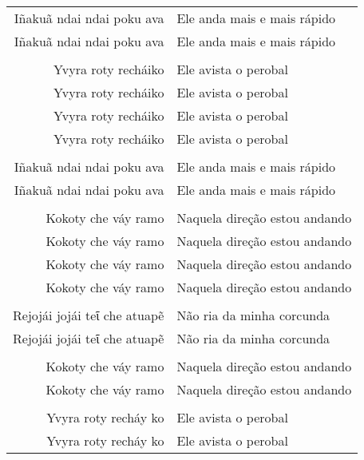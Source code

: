 \begin{table}[]
\begin{tabular}{rl}
Iñakuã ndai ndai poku ava\footnotemark{}  & Ele anda mais e mais rápido           \\
Iñakuã ndai ndai poku ava          & Ele anda mais e mais rápido           \\
                  &                     \\
Yvyra roty recháiko& Ele avista o perobal\footnotemark{}           \\
Yvyra roty recháiko& Ele avista o perobal           \\
Yvyra roty recháiko& Ele avista o perobal           \\
Yvyra roty recháiko& Ele avista o perobal           \\
                  &                     \\
Iñakuã ndai ndai poku ava   & Ele anda mais e mais rápido           \\
Iñakuã ndai ndai poku ava   & Ele anda mais e mais rápido           \\
                  &                     \\
Kokoty che váy ramo          & Naquela direção estou andando           \\
Kokoty che váy ramo          & Naquela direção estou andando           \\
Kokoty che váy ramo          & Naquela direção estou andando           \\
Kokoty che váy ramo          & Naquela direção estou andando           \\
                  &                     \\
Rejojái jojái teῖ che atuapẽ          & Não ria da minha corcunda           \\
Rejojái jojái teῖ che atuapẽ          & Não ria da minha corcunda           \\
                  &                     \\
Kokoty che váy ramo          & Naquela direção estou andando           \\
Kokoty che váy ramo          & Naquela direção estou andando           \\
                  &                     \\
Yvyra roty recháy ko          & Ele avista o perobal           \\
Yvyra roty recháy ko          & Ele avista o perobal           \\

\end{tabular}
\end{table}
